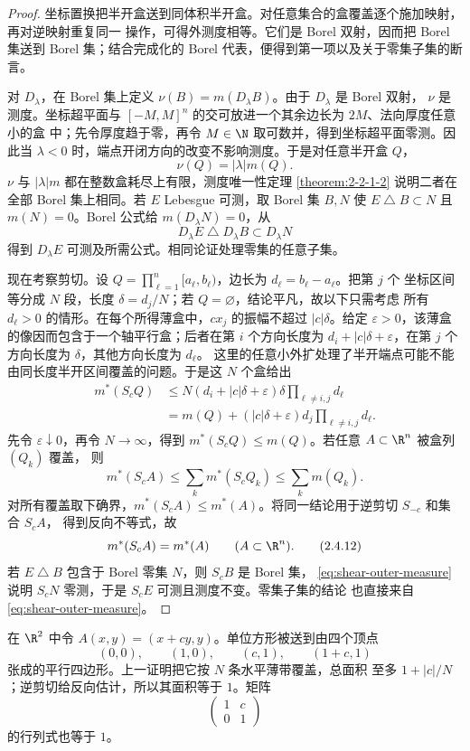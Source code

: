 \begin{proof}
坐标置换把半开盒送到同体积半开盒。对任意集合的盒覆盖逐个施加映射，再对逆映射重复同一
操作，可得外测度相等。它们是 Borel 双射，因而把 Borel 集送到 Borel 集；结合完成化的 Borel
代表，便得到第一项以及关于零集子集的断言。

对 $D_\lambda$，在 Borel 集上定义 $\nu(B)=m(D_\lambda B)$。由于 $D_\lambda$ 是 Borel 双射，
$\nu$ 是测度。坐标超平面与 $[-M,M]^n$ 的交可放进一个其余边长为 $2M$、法向厚度任意小的盒
中；先令厚度趋于零，再令 $M\in\N$ 取可数并，得到坐标超平面零测。因此当
$\lambda<0$ 时，端点开闭方向的改变不影响测度。于是对任意半开盒 $Q$，
\[
 \nu(Q)=|\lambda|m(Q).
\]
$\nu$ 与 $|\lambda|m$ 都在整数盒耗尽上有限，测度唯一性定理
\ref{theorem:2-2-1-2} 说明二者在全部 Borel 集上相同。若 $E$ Lebesgue 可测，取 Borel 集
$B,N$ 使 $E\mathbin\triangle B\subset N$ 且 $m(N)=0$。Borel 公式给
$m(D_\lambda N)=0$，从
\[
 D_\lambda E\mathbin\triangle D_\lambda B\subset D_\lambda N
\]
得到 $D_\lambda E$ 可测及所需公式。相同论证处理零集的任意子集。

现在考察剪切。设
$Q=\prod_{\ell=1}^n[a_\ell,b_\ell)$，边长为 $d_\ell=b_\ell-a_\ell$。把第 $j$ 个
坐标区间等分成 $N$ 段，长度 $\delta=d_j/N$；若 $Q=\varnothing$，结论平凡，故以下只需考虑
所有 $d_\ell>0$ 的情形。在每个所得薄盒中，$cx_j$ 的振幅不超过
$|c|\delta$。给定 $\varepsilon>0$，该薄盒的像因而包含于一个轴平行盒；后者在第 $i$ 个方向长度为
$d_i+|c|\delta+\varepsilon$，在第 $j$ 个方向长度为 $\delta$，其他方向长度为 $d_\ell$。
这里的任意小外扩处理了半开端点可能不能由同长度半开区间覆盖的问题。于是这 $N$ 个盒给出
\[
 \begin{aligned}
 m^*(S_cQ)
 &\le N(d_i+|c|\delta+\varepsilon)\delta
       \prod_{\ell\ne i,j}d_\ell\\
 &=m(Q)+(|c|\delta+\varepsilon)d_j\prod_{\ell\ne i,j}d_\ell.
 \end{aligned}
\]
先令 $\varepsilon\downarrow0$，再令 $N\to\infty$，得到 $m^*(S_cQ)\le m(Q)$。若任意 $A\subset\R^n$ 被盒列 $(Q_k)$ 覆盖，
则
\[
 m^*(S_cA)\le\sum_km^*(S_cQ_k)\le\sum_km(Q_k).
\]
对所有覆盖取下确界，$m^*(S_cA)\le m^*(A)$。将同一结论用于逆剪切 $S_{-c}$ 和集合 $S_cA$，
得到反向不等式，故
\[
 m^*(S_cA)=m^*(A)\qquad(A\subset\R^n).
 \tag{2.4.12}\label{eq:shear-outer-measure}
\]
若 $E\mathbin\triangle B$ 包含于 Borel 零集 $N$，则 $S_cB$ 是 Borel 集，
\eqref{eq:shear-outer-measure} 说明 $S_cN$ 零测，于是 $S_cE$ 可测且测度不变。零集子集的结论
也直接来自 \eqref{eq:shear-outer-measure}。
\end{proof}

\begin{example}[剪切]\label{ex:2-4-2-1}
在 $\R^2$ 中令 $A(x,y)=(x+cy,y)$。单位方形被送到由四个顶点
\[
 (0,0),\qquad(1,0),\qquad(c,1),\qquad(1+c,1)
\]
张成的平行四边形。上一证明把它按 $N$ 条水平薄带覆盖，总面积
至多 $1+|c|/N$；逆剪切给反向估计，所以其面积等于 $1$。矩阵
\[
 \begin{pmatrix}1&c\\0&1\end{pmatrix}
\]
的行列式也等于 $1$。
\end{example}

